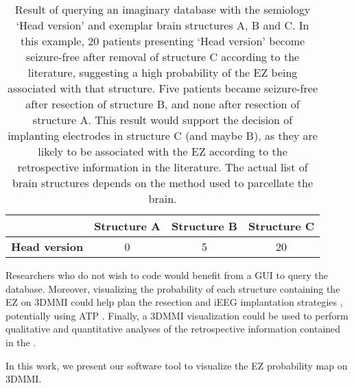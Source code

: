 \begin{table}
  \setlength{\tabcolsep}{3pt}
  \centering
  \caption[Result of querying an imaginary database with one semiology]{
    Result of querying an imaginary database with the semiology `Head version' and exemplar brain structures A, B and C.
    In this example, 20 patients presenting `Head version' become seizure-free after removal of structure C according to the literature, suggesting a high probability of the \ac{EZ} being associated with that structure.
    Five patients became seizure-free after resection of structure B, and none after resection of structure A.
    This result would support the decision of implanting electrodes in structure C (and maybe B), as they are likely to be associated with the \ac{EZ} according to the retrospective information in the literature.
    The actual list of brain structures depends on the method used to parcellate the brain.
  }
  \label{tab:single_semiology}
  \begin{tabular}{l*3c}
    \toprule
                          & \textbf{Structure A} & \textbf{Structure B} & \textbf{Structure C} \\
    \midrule
    \textbf{Head version} &                    0 &                    5 &                   20 \\
  \end{tabular}
\end{table}

Researchers who do not wish to code would benefit from a \ac{GUI} to query the database.
Moreover, visualizing the probability of each structure containing the \ac{EZ} on \ac{3DMMI} could help plan the resection and \ac{iEEG} implantation strategies \cite{nowell_resection_2017, nowell_utility_2015}, potentially using \ac{ATP} \cite{sparks_automated_2017}.
Finally, a \ac{3DMMI} visualization could be used to perform qualitative and quantitative analyses of the retrospective information contained in the \svtdatabase.

In this work, we present our software tool to visualize the \ac{EZ} probability map on \ac{3DMMI}.

